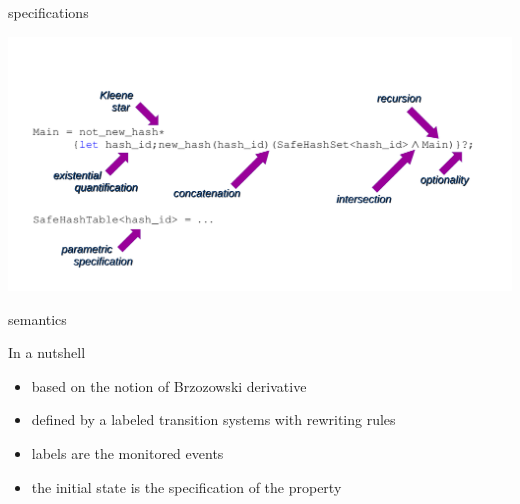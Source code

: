 \documentclass[10pt,usenames,dvipsnames]{beamer}
\begin{document}
\begin{frame}[fragile]{\rml specifications}
  \begin{center}
    \includegraphics[keepaspectratio,width=1.4\textheight]{images/RMLfragAnnot2}
  \end{center}











\end{frame}


\begin{frame}{\rml semantics}
  \begin{block}{In a nutshell}
    \begin{itemize}
    \item based on the notion of Brzozowski derivative 
    \item defined by a labeled transition systems with rewriting rules
    \item labels are the monitored events
    \item the initial state is the specification of the property
    \end{itemize}
  \end{block}
\end{frame}

\end{document}
